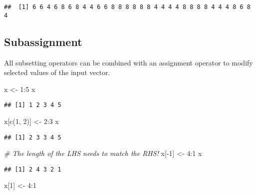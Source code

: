 \documentclass[
]{book}
\newenvironment{Shaded}{\begin{snugshade}}{\end{snugshade}}
\newcommand{\CommentTok}[1]{\textcolor[rgb]{0.56,0.35,0.01}{\textit{#1}}}
\newcommand{\DecValTok}[1]{\textcolor[rgb]{0.00,0.00,0.81}{#1}}
\newcommand{\FunctionTok}[1]{\textcolor[rgb]{0.00,0.00,0.00}{#1}}
\newcommand{\NormalTok}[1]{#1}
\newcommand{\OtherTok}[1]{\textcolor[rgb]{0.56,0.35,0.01}{#1}}
\newcommand{\SpecialCharTok}[1]{\textcolor[rgb]{0.00,0.00,0.00}{#1}}
\begin{document}
\begin{verbatim}
##  [1] 6 6 4 6 8 6 8 4 4 6 6 8 8 8 8 8 8 4 4 4 4 8 8 8 8 4 4 4 8 6 8 4
\end{verbatim}

\hypertarget{subassignment}{%
\subsection{Subassignment}\label{subassignment}}

All subsetting operators can be combined with an assignment operator to modify selected values of the input vector.

\begin{Shaded}
\begin{Highlighting}[]
\NormalTok{x }\OtherTok{\textless{}{-}} \DecValTok{1}\SpecialCharTok{:}\DecValTok{5}
\NormalTok{x}
\end{Highlighting}
\end{Shaded}

\begin{verbatim}
## [1] 1 2 3 4 5
\end{verbatim}

\begin{Shaded}
\begin{Highlighting}[]
\NormalTok{x[}\FunctionTok{c}\NormalTok{(}\DecValTok{1}\NormalTok{, }\DecValTok{2}\NormalTok{)] }\OtherTok{\textless{}{-}} \DecValTok{2}\SpecialCharTok{:}\DecValTok{3}
\NormalTok{x}
\end{Highlighting}
\end{Shaded}

\begin{verbatim}
## [1] 2 3 3 4 5
\end{verbatim}

\begin{Shaded}
\begin{Highlighting}[]
\CommentTok{\# The length of the LHS needs to match the RHS!}
\NormalTok{x[}\SpecialCharTok{{-}}\DecValTok{1}\NormalTok{] }\OtherTok{\textless{}{-}} \DecValTok{4}\SpecialCharTok{:}\DecValTok{1}
\NormalTok{x}
\end{Highlighting}
\end{Shaded}

\begin{verbatim}
## [1] 2 4 3 2 1
\end{verbatim}

\begin{Shaded}
\begin{Highlighting}[]
\NormalTok{x[}\DecValTok{1}\NormalTok{] }\OtherTok{\textless{}{-}} \DecValTok{4}\SpecialCharTok{:}\DecValTok{1}
\end{Highlighting}
\end{Shaded}
\end{document}
